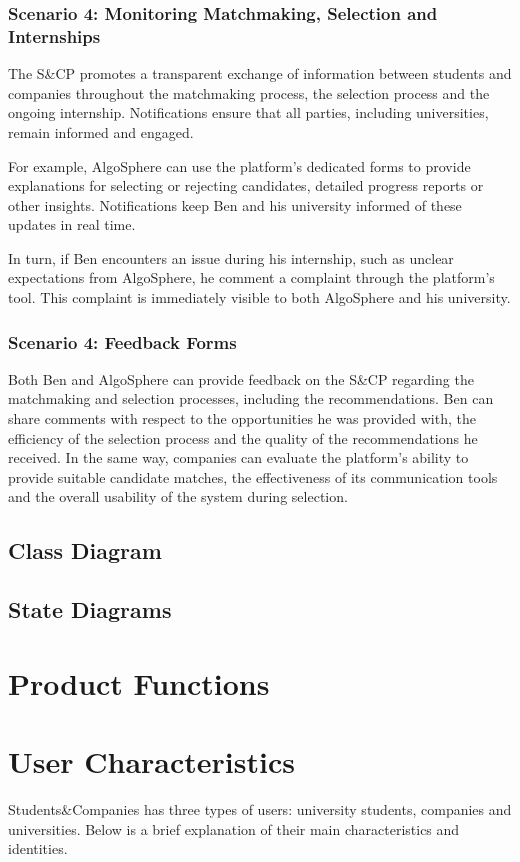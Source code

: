 \subsubsection{Scenario 4: Monitoring Matchmaking, Selection and Internships}
The S\&CP promotes a transparent exchange of information between students and companies throughout the matchmaking process, the selection process and the ongoing internship.
Notifications ensure that all parties, including universities, remain informed and engaged.

For example, AlgoSphere can use the platform's dedicated forms to provide explanations for selecting or rejecting candidates, detailed progress reports or other insights.
Notifications keep Ben and his university informed of these updates in real time.

In turn, if Ben encounters an issue during his internship, such as unclear expectations from AlgoSphere, he comment a complaint through the platform's tool.
This complaint is immediately visible to both AlgoSphere and his university.

\subsubsection{Scenario 4: Feedback Forms}
Both Ben and AlgoSphere can provide feedback on the S\&CP regarding the matchmaking and selection processes, including the recommendations.
Ben can share comments with respect to the opportunities he was provided with, the efficiency of the selection process and the quality of the recommendations he received.
In the same way, companies can evaluate the platform's ability to provide suitable candidate matches, the effectiveness of its communication tools and the overall usability of the system during selection.

\subsection{Class Diagram}
\subsection{State Diagrams}
\section{Product Functions}
\section{User Characteristics}
Students\&Companies has three types of users: university students, companies and universities.
Below is a brief explanation of their main characteristics and identities.


